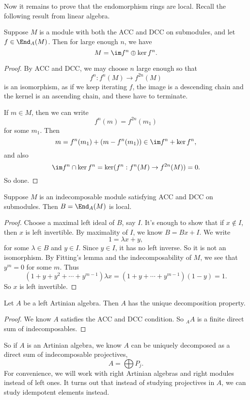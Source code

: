 \documentclass[a4paper]{article}
\begin{document}
Now it remains to prove that the endomorphism rings are local. Recall the following result from linear algebra.
\begin{lemma}[Fitting]
  Suppose $M$ is a module with both the ACC and DCC on submodules, and let $f \in \End_A(M)$. Then for large enough $n$, we have
  \[
    M = \im f^n \oplus \ker f^n.
  \]
\end{lemma}

\begin{proof}
  By ACC and DCC, we may choose $n$ large enough so that
  \[
    f^n: f^n(M) \to f^{2n}(M)
  \]
  is an isomorphism, as if we keep iterating $f$, the image is a descending chain and the kernel is an ascending chain, and these have to terminate.

  If $m \in M$, then we can write
  \[
    f^n(m) = f^{2n}(m_1)
  \]
  for some $m_1$. Then
  \[
    m = f^n(m_1) + (m - f^n(m_1)) \in \im f^n + \ker f^n,
  \]
  and also
  \[
    \im f^n \cap \ker f^n = \ker (f^n: f^n(M) \to f^{2n}(M)) = 0.
  \]
  So done.
\end{proof}

\begin{lemma}
  Suppose $M$ is an indecomposable module satisfying ACC and DCC on submodules. Then $B = \End_A(M)$ is local.
\end{lemma}

\begin{proof}
  Choose a maximal left ideal of $B$, say $I$. It's enough to show that if $x \not \in I$, then $x$ is left invertible. By maximality of $I$, we know $B = Bx + I$. We write
  \[
    1 = \lambda x + y,
  \]
  for some $\lambda \in B$ and $y \in I$. Since $y \in I$, it has no left inverse. So it is not an isomorphism. By Fitting's lemma and the indecomposability of $M$, we see that $y^m = 0$ for some $m$. Thus
  \[
    (1 + y + y^2 + \cdots + y^{m - 1}) \lambda x = (1 + y + \cdots + y^{m - 1})(1 - y) = 1.
  \]
  So $x$ is left invertible.
\end{proof}

\begin{cor}
  Let $A$ be a left Artinian algebra. Then $A$ has the unique decomposition property.
\end{cor}

\begin{proof}
  We know $A$ satisfies the ACC and DCC condition. So $_A A$ is a finite direct sum of indecomposables.
\end{proof}

So if $A$ is an Artinian algebra, we know $A$ can be uniquely decomposed as a direct sum of indecomposable projectives,
\[
  A = \bigoplus P_j.
\]
For convenience, we will work with right Artinian algebras and right modules instead of left ones. It turns out that instead of studying projectives in $A$, we can study idempotent elements instead.
\end{document}
